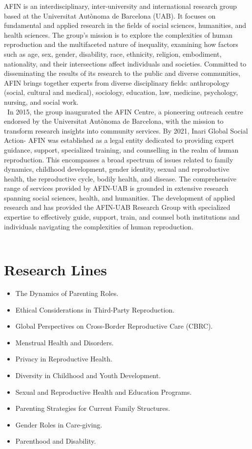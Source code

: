 \documentclass[english,a4paper,12pt,titlepage]{report}
\begin{document}
	AFIN is an interdisciplinary, inter-university and international research group based at the Universitat Autònoma de Barcelona (UAB). It focuses on fundamental and applied research in the fields of social sciences, humanities, and health sciences. The group's mission is to explore the complexities of human reproduction and the multifaceted nature of inequality, examining how factors such as age, sex, gender, disability, race, ethnicity, religion, embodiment, nationality, and their intersections affect individuals and societies. Committed to disseminating the results of its research to the public and diverse communities, AFIN brings together experts from diverse disciplinary fields: anthropology (social, cultural and medical), sociology, education, law, medicine, psychology, nursing, and social work.\\\
	In 2015, the group inaugurated the AFIN Centre, a pioneering outreach centre endorsed by the Universitat Autònoma de Barcelona, with the mission to transform research insights into community services. By 2021, Inari Global Social Action- AFIN was established as a legal entity dedicated to providing expert guidance, support, specialized training, and counselling in the realm of human reproduction. This encompasses a broad spectrum of issues related to family dynamics, childhood development, gender identity, sexual and reproductive health, the reproductive cycle, bodily health, and disease. The comprehensive range of services provided by AFIN-UAB is grounded in extensive research spanning social sciences, health, and humanities. The development of applied research and has provided the AFIN-UAB Research Group with specialized expertise to effectively guide, support, train, and counsel both institutions and individuals navigating the complexities of human reproduction.\\\
	

	
	\chapter{Research Lines}
	\begin{itemize}
		\item The Dynamics of Parenting Roles.
		\item Ethical Considerations in Third-Party Reproduction.
		\item Global Perspectives on Cross-Border Reproductive Care (CBRC).
		\item Menstrual Health and Disorders.
		\item Privacy in Reproductive Health.
		\item Diversity in Childhood and Youth Development. 
		\item Sexual and Reproductive Health and Education Programs.
		\item Parenting Strategies for Current Family Structures.
		\item Gender Roles in Care-giving.
		\item Parenthood and Disability.  
	\end{itemize}
	
\end{document}
